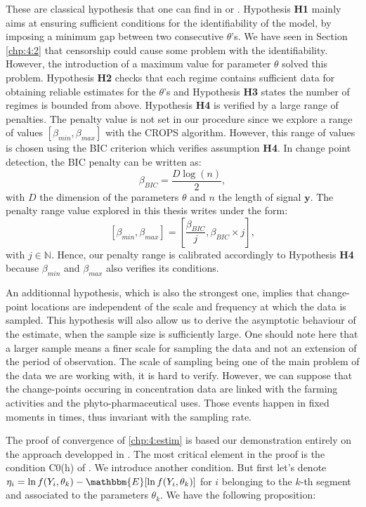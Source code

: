 \begin{appendices}
These are classical hypothesis that one can find in \cite{Lavielle1997} or \cite{He2010}. Hypothesis \textbf{H1} mainly aims at ensuring sufficient conditions for the identifiability of the model, by imposing a minimum gap between two consecutive $\theta$'s. We have seen in Section \ref{chp:4:2} that censorship could cause some problem with the identifiability. However, the introduction of a maximum value for parameter $\theta$ solved this problem. Hypothesis \textbf{H2} checks that each regime contains sufficient data for obtaining reliable estimates for the $\theta$'s and Hypothesis \textbf{H3} states the number of regimes is bounded from above. Hypothesis \textbf{H4} is verified by a large range of penalties. The penalty value is not set in our procedure since we explore a range of values $[\beta_{min},\beta_{max}]$ with the CROPS algorithm. However, this range of values is chosen using the BIC criterion \citep{YAO1988181} which verifies assumption \textbf{H4}. In change point detection, the BIC penalty can be written as: 
$$\beta_{BIC} = \frac{D\log(n)}{2},$$
with $D$ the dimension of the parameters $\theta$ and $n$ the length of signal $\bm y$. The penalty range value explored in this thesis writes under the form: 
$$[\beta_{min},\beta_{max}] = [\frac{\beta_{BIC}}{j},\beta_{BIC}\times j],$$
with $j\in\mathbb{N}$. Hence, our penalty range is calibrated accordingly to Hypothesis \textbf{H4} because $\beta_{min}$ and $\beta_{max}$ also verifies its conditions.  

An additionnal hypothesis, which is also the strongest one, implies that change-point locations are independent of the scale and frequency at which the data is sampled. This hypothesis will also allow us to derive the asymptotic behaviour of the estimate, when the sample size is sufficiently large. One should note here that a larger sample means a finer scale for sampling the data and not an extension of the period of observation. The scale of sampling being one of the main problem of the data we are working with, it is hard to verify. However, we can suppose that the change-points occuring in concentration data are linked with the farming activities and the phyto-pharmaceutical uses. Those events happen in fixed moments in times, thus invariant with the sampling rate. 


The proof of convergence of \ref{chp:4:estim} is based our demonstration entirely on the approach developped in \cite{Lavielle1997}. The most critical element in the proof is the condition C0(h) of \cite{Lavielle1997}. We introduce another condition. But first let's denote $\eta_i = \ln f(Y_i,\theta_{k})-\mathbbm{E}[\ln f(Y_i,\theta_{k})]$ for $i$ belonging to the $k$-th segment and associated to the parameters $\theta_{k}$. We have the following proposition: 
 

\end{appendices}

